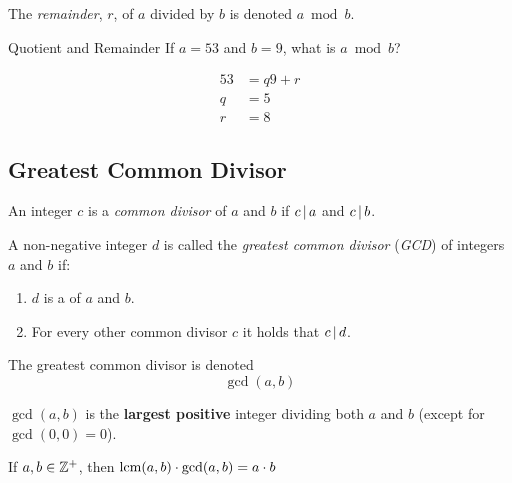 \begin{definition}[Remainder]\label{def:Remainder}
  The \emph{remainder}, $r$, of $a$ divided by $b$ is denoted $a \bmod b$.
\end{definition}

\begin{example}[]{Quotient and Remainder}
  If $a=53$ and $b=9$, what is $a \bmod b$?

  \tcblower{}

  \begin{align*}
    53 &= q9 + r \\
    q &= 5 \\
    r &= 8
  \end{align*}
\end{example}

\subsection{Greatest Common Divisor}\label{subsec:Greatest_Common_Divisor}
\begin{definition}\label{def:Common_Divisor}
  An integer $c$ is a \emph{common divisor} of $a$ and $b$ if $c \operatorname{\vert} a$ and $c \operatorname{\vert} b$.
\end{definition}

\begin{definition}\label{def:GCD}
  A non-negative integer $d$ is called the \emph{greatest common divisor} (\emph{GCD}) of integers $a$ and $b$ if:
  \begin{enumerate}[noitemsep]
  \item $d$ is a  of $a$ and $b$.
  \item For every other common divisor $c$ it holds that $c \operatorname{\vert} d$.
  \end{enumerate}

  The greatest common divisor is denoted
  \begin{equation}\label{eq:GCD}
    \gcd(a, b)
  \end{equation}

  $\gcd(a,b)$ is the \textbf{largest positive} integer dividing both $a$ and $b$ (except for $\gcd(0,0)=0$).
  
  \begin{remark}
    If $a, b \in \operatorname{\mathbb{Z}^{+}}$, then $\operatorname{\text{lcm}}(a, b) \cdot \gcd(a, b) = a \cdot b$
  \end{remark}
\end{definition}

